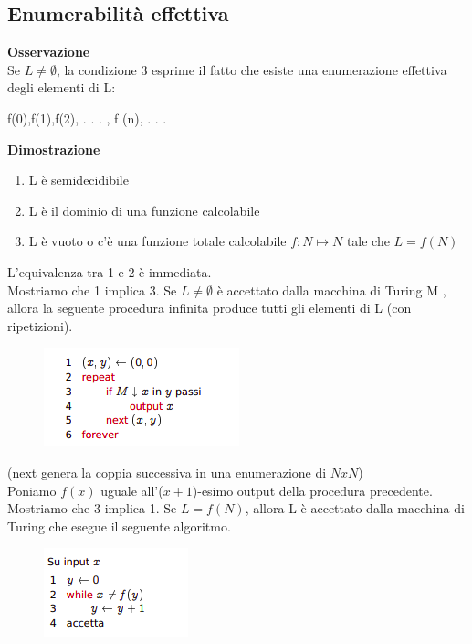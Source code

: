 \subsection{Enumerabilità effettiva}
\textbf{Osservazione}\\
Se $L\neq\emptyset$, la condizione 3 esprime il fatto che esiste una enumerazione effettiva degli elementi di L:
\begin{center}
    f(0),f(1),f(2), . . . , f (n), . . .
\end{center}
\textbf{Dimostrazione}
\begin{enumerate}
    \item L è semidecidibile
    
    \item L è il dominio di una funzione calcolabile
    
    \item L è vuoto o c’è una funzione totale calcolabile $f : N \mapsto N$ tale che $L = f (N)$
\end{enumerate}
L’equivalenza tra 1 e 2 è immediata.\\
Mostriamo che 1 implica 3. Se $L\neq\emptyset$ è accettato dalla macchina di Turing M , allora la seguente procedura infinita produce tutti gli elementi di L (con ripetizioni).\\
\begin{figure}[htp]
    \includegraphics[scale=0.8]{tesi_stile/img/semi2.png}
\end{figure}
(next genera la coppia successiva in una enumerazione di $N x N$)\\
Poniamo $f(x)$ uguale all’($x+1$)-esimo output della procedura precedente.\\
Mostriamo che 3 implica 1. Se $L = f (N)$, allora L è accettato dalla macchina di Turing che esegue il seguente algoritmo.
\begin{figure}[htp]
    \includegraphics[scale=0.8]{tesi_stile/img/semi3.png}
\end{figure}
